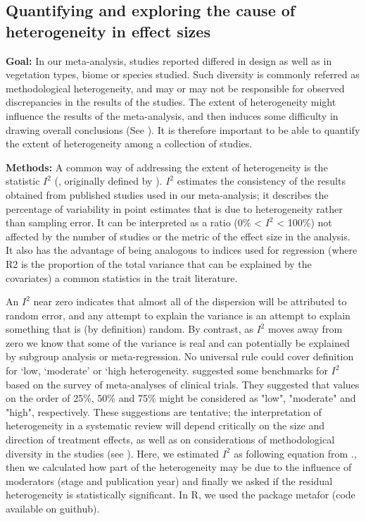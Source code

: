 \documentclass[a4paper]{article}\usepackage[]{graphicx}\usepackage[]{color}
\begin{document}
\begin{appendices}
\subsection{Quantifying and exploring the cause of heterogeneity in effect sizes}

\textbf{Goal:} In our meta-analysis, studies reported differed in design as well as in vegetation types, biome or species studied. Such diversity is commonly referred as methodological heterogeneity, and may or may not be responsible for observed discrepancies in the results of the studies. The extent of heterogeneity might influence the results of the meta-analysis, and then induces some difficulty in drawing overall conclusions (See \citealt{Higgins:2002iq}). It is therefore important to be able to quantify the extent of heterogeneity among a collection of studies. 

\textbf{Methods:} A common way of addressing the extent of heterogeneity is the statistic $I^{2}$ (\citealt{Santos:2012gt}, originally defined by \citealt{Higgins:2002iq}). $I^{2}$ estimates the consistency of the results obtained from published studies used in our meta-analysis; it describes the percentage of variability in point estimates that is due to heterogeneity rather than sampling error. It can be interpreted as a ratio (0\% < $I^{2}$ < 100\%) not affected by the number of studies or the metric of the effect size in the analysis. It also has the advantage of being analogous to indices used for regression (where R2 is the proportion of the total variance that can be explained by the covariates) a common statistics in the trait literature.

An $I^{2}$ near zero indicates that almost all of the dispersion will be attributed to random error, and any attempt to explain the variance is an attempt to explain something that is (by definition) random. By contrast, as $I^{2}$ moves away from zero we know that some of the variance is real and can potentially be explained by subgroup analysis or meta-regression. 
No universal rule could cover definition for ‘low, ‘moderate’ or ‘high heterogeneity. \citealt{Higgins:2003hz} suggested some benchmarks for $I^{2}$ based on the survey of meta-analyses of clinical trials. They suggested that values on the order of 25\%, 50\% and 75\% might be considered as "low", "moderate" and "high", respectively. These suggestions are tentative; the interpretation of heterogeneity in a systematic review will depend critically on the size and direction of treatment effects, as well as on considerations of methodological diversity in the studies (see \citealt{Borenstein:2009um}).
Here, we estimated $I^{2}$ as following equation from \citealt{Higgins:2002iq}., then we calculated how part of the heterogeneity may be due to the influence of moderators (stage and publication year) and finally we asked if the residual heterogeneity is statistically significant. In R, we used the package metafor (code available on guithub).



\end{appendices}
\end{document}
